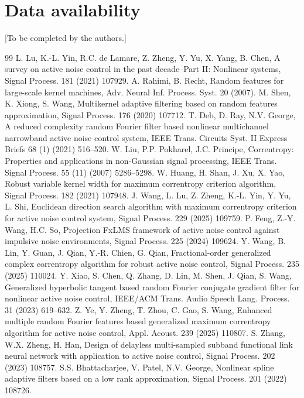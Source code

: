 \documentclass[preprint,12pt]{elsarticle}
\begin{document}
\section*{Data availability}
[To be completed by the authors.]
\begin{thebibliography}{99}
 L. Lu, K.-L. Yin, R.C. de Lamare, Z. Zheng, Y. Yu, X. Yang, B. Chen, A survey on active noise control in the past decade–Part II: Nonlinear systems, Signal Process. 181 (2021) 107929.
 A. Rahimi, B. Recht, Random features for large-scale kernel machines, Adv. Neural Inf. Process. Syst. 20 (2007).
 M. Shen, K. Xiong, S. Wang, Multikernel adaptive filtering based on random features approximation, Signal Process. 176 (2020) 107712.
 T. Deb, D. Ray, N.V. George, A reduced complexity random Fourier filter based nonlinear multichannel narrowband active noise control system, IEEE Trans. Circuits Syst. II Express Briefs 68 (1) (2021) 516–520.
 W. Liu, P.P. Pokharel, J.C. Principe, Correntropy: Properties and applications in non-Gaussian signal processing, IEEE Trans. Signal Process. 55 (11) (2007) 5286–5298.
 W. Huang, H. Shan, J. Xu, X. Yao, Robust variable kernel width for maximum correntropy criterion algorithm, Signal Process. 182 (2021) 107948.
 J. Wang, L. Lu, Z. Zheng, K.-L. Yin, Y. Yu, L. Shi, Euclidean direction search algorithm with maximum correntropy criterion for active noise control system, Signal Process. 229 (2025) 109759.
 P. Feng, Z.-Y. Wang, H.C. So, Projection FxLMS framework of active noise control against impulsive noise environments, Signal Process. 225 (2024) 109624.
 Y. Wang, B. Lin, Y. Guan, J. Qian, Y.-R. Chien, G. Qian, Fractional-order generalized complex correntropy algorithm for robust active noise control, Signal Process. 235 (2025) 110024.
 Y. Xiao, S. Chen, Q. Zhang, D. Lin, M. Shen, J. Qian, S. Wang, Generalized hyperbolic tangent based random Fourier conjugate gradient filter for nonlinear active noise control, IEEE/ACM Trans. Audio Speech Lang. Process. 31 (2023) 619–632.
 Z. Ye, Y. Zheng, T. Zhou, C. Gao, S. Wang, Enhanced multiple random Fourier features based generalized maximum correntropy algorithm for active noise control, Appl. Acoust. 239 (2025) 110807.
 S. Zhang, W.X. Zheng, H. Han, Design of delayless multi-sampled subband functional link neural network with application to active noise control, Signal Process. 202 (2023) 108757.
 S.S. Bhattacharjee, V. Patel, N.V. George, Nonlinear spline adaptive filters based on a low rank approximation, Signal Process. 201 (2022) 108726.

\end{thebibliography}
\end{document}
